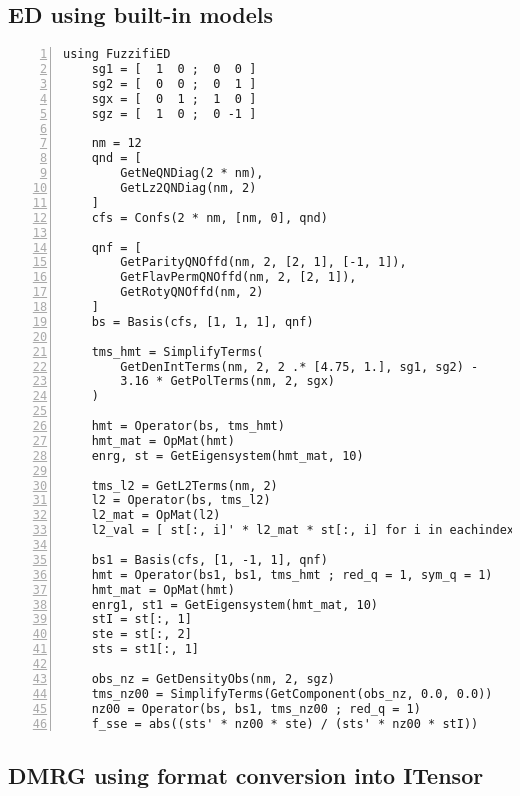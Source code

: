 \documentclass{timesjhep}
\begin{document}
\subsection{ED using built-in models}
\label{app:code_ed2}

\begin{lstlisting}[numbers=left]
    using FuzzifiED
    sg1 = [  1  0 ;  0  0 ]
    sg2 = [  0  0 ;  0  1 ]
    sgx = [  0  1 ;  1  0 ]
    sgz = [  1  0 ;  0 -1 ]

    nm = 12
    qnd = [ 
        GetNeQNDiag(2 * nm), 
        GetLz2QNDiag(nm, 2) 
    ]
    cfs = Confs(2 * nm, [nm, 0], qnd)

    qnf = [ 
        GetParityQNOffd(nm, 2, [2, 1], [-1, 1]), 
        GetFlavPermQNOffd(nm, 2, [2, 1]), 
        GetRotyQNOffd(nm, 2) 
    ]
    bs = Basis(cfs, [1, 1, 1], qnf)

    tms_hmt = SimplifyTerms(
        GetDenIntTerms(nm, 2, 2 .* [4.75, 1.], sg1, sg2) - 
        3.16 * GetPolTerms(nm, 2, sgx) 
    )

    hmt = Operator(bs, tms_hmt)
    hmt_mat = OpMat(hmt)
    enrg, st = GetEigensystem(hmt_mat, 10)

    tms_l2 = GetL2Terms(nm, 2)
    l2 = Operator(bs, tms_l2)
    l2_mat = OpMat(l2)
    l2_val = [ st[:, i]' * l2_mat * st[:, i] for i in eachindex(enrg)]

    bs1 = Basis(cfs, [1, -1, 1], qnf)
    hmt = Operator(bs1, bs1, tms_hmt ; red_q = 1, sym_q = 1) 
    hmt_mat = OpMat(hmt)
    enrg1, st1 = GetEigensystem(hmt_mat, 10)
    stI = st[:, 1] 
    ste = st[:, 2] 
    sts = st1[:, 1]

    obs_nz = GetDensityObs(nm, 2, sgz)
    tms_nz00 = SimplifyTerms(GetComponent(obs_nz, 0.0, 0.0))
    nz00 = Operator(bs, bs1, tms_nz00 ; red_q = 1) 
    f_sse = abs((sts' * nz00 * ste) / (sts' * nz00 * stI))
\end{lstlisting}

\subsection{DMRG using format conversion into ITensor}
\end{document}
